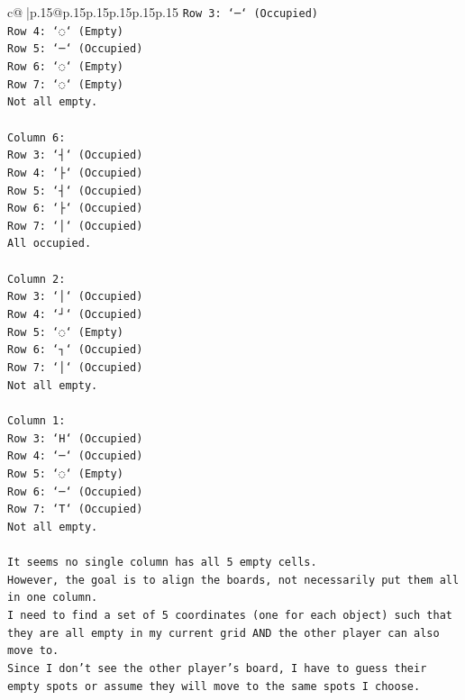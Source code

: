 \documentclass{article}
\begin{document}
{\begin{supertabular}{c@{$\;$}|p{.15\linewidth}@{}p{.15\linewidth}p{.15\linewidth}p{.15\linewidth}p{.15\linewidth}p{.15\linewidth}}
{{{\texttt{Row 3: `─` (Occupied)} \\
\texttt{Row 4: `◌` (Empty)} \\
\texttt{Row 5: `─` (Occupied)} \\
\texttt{Row 6: `◌` (Empty)} \\
\texttt{Row 7: `◌` (Empty)} \\
\texttt{Not all empty.} \\
\\ 
\texttt{Column 6:} \\
\texttt{Row 3: `┤` (Occupied)} \\
\texttt{Row 4: `├` (Occupied)} \\
\texttt{Row 5: `┤` (Occupied)} \\
\texttt{Row 6: `├` (Occupied)} \\
\texttt{Row 7: `│` (Occupied)} \\
\texttt{All occupied.} \\
\\ 
\texttt{Column 2:} \\
\texttt{Row 3: `│` (Occupied)} \\
\texttt{Row 4: `┘` (Occupied)} \\
\texttt{Row 5: `◌` (Empty)} \\
\texttt{Row 6: `┐` (Occupied)} \\
\texttt{Row 7: `│` (Occupied)} \\
\texttt{Not all empty.} \\
\\ 
\texttt{Column 1:} \\
\texttt{Row 3: `H` (Occupied)} \\
\texttt{Row 4: `─` (Occupied)} \\
\texttt{Row 5: `◌` (Empty)} \\
\texttt{Row 6: `─` (Occupied)} \\
\texttt{Row 7: `T` (Occupied)} \\
\texttt{Not all empty.} \\
\\ 
\texttt{It seems no single column has all 5 empty cells.} \\
\texttt{However, the goal is to align the boards, not necessarily put them all in one column.} \\
\texttt{I need to find a set of 5 coordinates (one for each object) such that they are all empty in my current grid AND the other player can also move to.} \\
\texttt{Since I don't see the other player's board, I have to guess their empty spots or assume they will move to the same spots I choose.} \\
}}}
\end{supertabular}}
\end{document}
